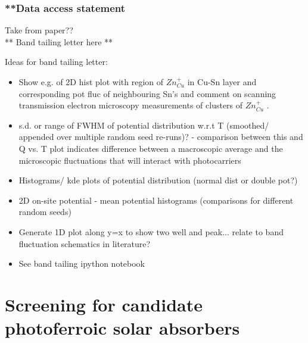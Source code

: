 \documentclass[11pt, twoside]{report}
\begin{document}
\subsection{**Data access statement}
Take from paper??\\

** Band tailing letter here **

Ideas for band tailing letter:
\begin{itemize}
\item Show e.g. of 2D hist plot with region of $Zn_{Cu}^{+}$ in Cu-Sn layer and corresponding pot fluc of neighbouring Sn's and comment on scanning transmission electron microscopy measurements of clusters of $Zn_{Cu}^{+}$ \cite{Zn-on-Cu_clusters}.
\item s.d. or range of FWHM of potential distribution w.r.t T (smoothed/ appended over multiple random seed re-runs)? - comparison between this and Q vs. T plot indicates difference between a macroscopic average and the microscopic fluctuations that will interact with photocarriers
\item Histograms/ kde plots of potential distribution (normal dist or double pot?)
\item 2D on-site potential - mean potential histograms (comparisons for different random seeds)
\item Generate 1D plot along y=x to show two well and peak... relate to band fluctuation schematics in literature?
\item See band tailing ipython notebook
\end{itemize}








\chapter{Screening for candidate photoferroic solar absorbers}\label{chap:screening}
\end{document}
